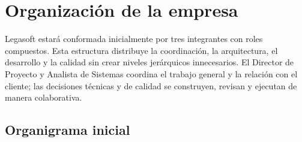 \section{Organización de la empresa}

Legasoft estará conformada inicialmente por tres integrantes con roles
compuestos. Esta estructura distribuye la coordinación, la arquitectura, el
desarrollo y la calidad sin crear niveles jerárquicos innecesarios. El Director
de Proyecto y Analista de Sistemas coordina el trabajo general y la relación con
el cliente; las decisiones técnicas y de calidad se construyen, revisan y
ejecutan de manera colaborativa.

\subsection{Organigrama inicial}

